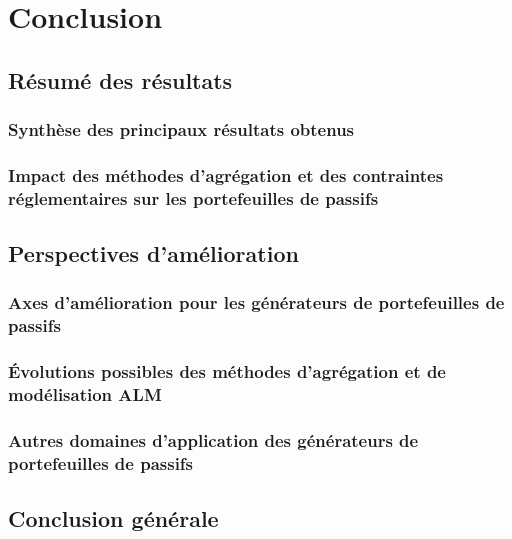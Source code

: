 \chapter{Conclusion}
\section{Résumé des résultats}
\subsection{Synthèse des principaux résultats obtenus}
\subsection{Impact des méthodes d'agrégation et des contraintes réglementaires sur les portefeuilles de passifs}

\section{Perspectives d'amélioration}
\subsection{Axes d'amélioration pour les générateurs de portefeuilles de passifs}
\subsection{Évolutions possibles des méthodes d'agrégation et de modélisation ALM}  
\subsection{Autres domaines d'application des générateurs de portefeuilles de passifs}
\section{Conclusion générale}
